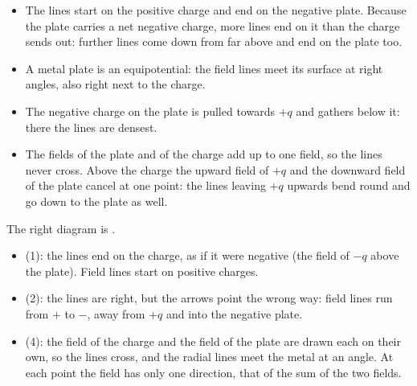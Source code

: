 \begin{abcliste}
\abc
\begin{itemize}
\item The lines start on the positive charge and end on the negative plate. Because the plate carries a net negative charge, more lines end on it than the charge sends out: further lines come down from far above and end on the plate too.
\item A metal plate is an equipotential: the field lines meet its surface at right angles, also right next to the charge.
\item The negative charge on the plate is pulled towards $+q$ and gathers below it: there the lines are densest.
\item The fields of the plate and of the charge add up to one field, so the lines never cross. Above the charge the upward field of $+q$ and the downward field of the plate cancel at one point: the lines leaving $+q$ upwards bend round and go down to the plate as well.
\end{itemize}

\abc The right diagram is .
\begin{itemize}
\item (1): the lines end on the charge, as if it were negative (the field of $-q$ above the plate). Field lines start on positive charges.
\item (2): the lines are right, but the arrows point the wrong way: field lines run from $+$ to $-$, away from $+q$ and into the negative plate.
\item (4): the field of the charge and the field of the plate are drawn each on their own, so the lines cross, and the radial lines meet the metal at an angle. At each point the field has only one direction, that of the sum of the two fields.
\end{itemize}
\end{abcliste}

